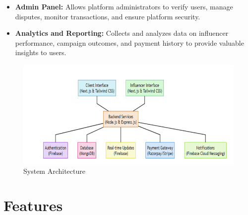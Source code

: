\begin{justify}
\begin{itemize}
    \item \textbf{Admin Panel:} Allows platform administrators to verify users, manage disputes, monitor transactions, and ensure platform security.
    
    \item \textbf{Analytics and Reporting:} Collects and analyzes data on influencer performance, campaign outcomes, and payment history to provide valuable insights to users.
\end{itemize}
\begin{figure}[H]
    \centering
    \includegraphics[height=0.3\textheight]{Chapters/Screenshot 2025-05-18 194104.png}
    \caption{System Architecture }
    \label{fig:system-workflow}
\end{figure}
\section{Features}

\end{justify}
